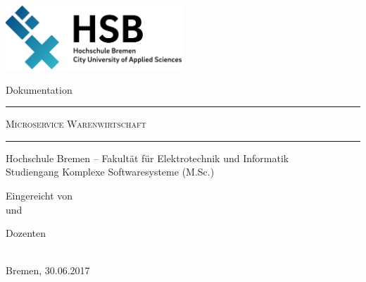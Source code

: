 \begin{titlepage}
\begin{center}

{
\setlength{\parskip}{0pt}

\vspace{5cm}

 	\includegraphics[width=0.50\textwidth]{./pics/hs-logo.png}

\vspace{3cm}

  
Dokumentation


\vspace{0.75cm}


{\hrule height 1pt} 


\vspace{0.5cm}

  
{\large{\textsc{Microservice Warenwirtschaft}}} 	  


\vspace{0.5cm}


{\hrule height 1pt}


 \vspace{0.75cm}


Hochschule Bremen -- Fakultät für Elektrotechnik und Informatik \\
Studiengang Komplexe Softwaresysteme (M.Sc.)

\vspace{3cm}


Eingereicht von\\
 und \\

\vspace{1cm}

Dozenten\\
\\

\vspace{3cm}

Bremen, 30.06.2017




}

\end{center}
\end{titlepage}
